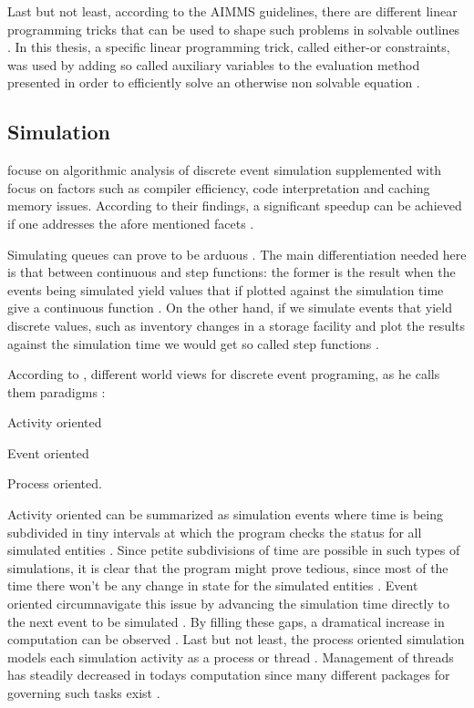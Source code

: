 \documentclass[draft=false]{seal_thesis}
\begin{document}
Last but not least, according to the AIMMS guidelines, there are different linear programming tricks that can be used to shape such problems in solvable outlines \citep{Bisschop2016}. In this thesis, a specific linear programming trick, called either-or constraints, was used by adding so called auxiliary variables to the evaluation method presented in order to efficiently solve an otherwise non solvable equation \citep[p. 77]{Bisschop2016}.

\subsection{Simulation}

\citet{Bahouth2007} focuse on algorithmic analysis of discrete event simulation supplemented with focus on factors such as compiler efficiency, code interpretation and caching memory issues. According to their findings, a significant speedup can be achieved if one addresses the afore mentioned facets \citep{Bahouth2007}.

Simulating queues can prove to be arduous \citep{Matloff2008}. The main differentiation needed here is that between continuous and step functions: the former is the result when the events being simulated yield values that if plotted against the simulation time give a continuous function \citep{Matloff2008}. On the other hand, if we simulate events that yield discrete values, such as inventory changes in a storage facility and plot the results against the simulation time we would get so called step functions \citep{Matloff2008}.

According to \citet{Matloff2008}, different world views for discrete event programing, as he calls them paradigms \citep{Matloff2008}:
\begin{enumerate*}
	\item Activity oriented
	\item Event oriented
	\item Process oriented.
\end{enumerate*}

Activity oriented can be summarized as simulation events where time is being subdivided in tiny intervals at which the program checks the status for all simulated entities \citep{Matloff2008}. Since petite subdivisions of time are possible in such types of simulations, it is clear that the program might prove tedious, since most of the time there won't be any change in state for the simulated entities \citep{Matloff2008}. Event oriented circumnavigate this issue by advancing the simulation time directly to the next event to be simulated \citep{Matloff2008}. By filling these gaps, a dramatical increase in computation can be observed \citep{Matloff2008}. Last but not least, the process oriented simulation models each simulation activity as a process or thread \citep{Matloff2008}. Management of threads has steadily decreased in todays computation since many different packages for governing such tasks exist \citep{Matloff2008}.
\end{document}
